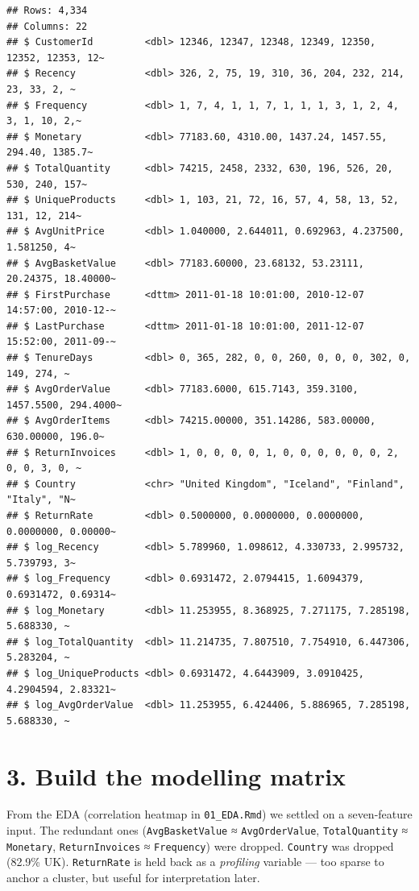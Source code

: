 \documentclass[
]{article}
\begin{document}
\begin{verbatim}
## Rows: 4,334
## Columns: 22
## $ CustomerId         <dbl> 12346, 12347, 12348, 12349, 12350, 12352, 12353, 12~
## $ Recency            <dbl> 326, 2, 75, 19, 310, 36, 204, 232, 214, 23, 33, 2, ~
## $ Frequency          <dbl> 1, 7, 4, 1, 1, 7, 1, 1, 1, 3, 1, 2, 4, 3, 1, 10, 2,~
## $ Monetary           <dbl> 77183.60, 4310.00, 1437.24, 1457.55, 294.40, 1385.7~
## $ TotalQuantity      <dbl> 74215, 2458, 2332, 630, 196, 526, 20, 530, 240, 157~
## $ UniqueProducts     <dbl> 1, 103, 21, 72, 16, 57, 4, 58, 13, 52, 131, 12, 214~
## $ AvgUnitPrice       <dbl> 1.040000, 2.644011, 0.692963, 4.237500, 1.581250, 4~
## $ AvgBasketValue     <dbl> 77183.60000, 23.68132, 53.23111, 20.24375, 18.40000~
## $ FirstPurchase      <dttm> 2011-01-18 10:01:00, 2010-12-07 14:57:00, 2010-12-~
## $ LastPurchase       <dttm> 2011-01-18 10:01:00, 2011-12-07 15:52:00, 2011-09-~
## $ TenureDays         <dbl> 0, 365, 282, 0, 0, 260, 0, 0, 0, 302, 0, 149, 274, ~
## $ AvgOrderValue      <dbl> 77183.6000, 615.7143, 359.3100, 1457.5500, 294.4000~
## $ AvgOrderItems      <dbl> 74215.00000, 351.14286, 583.00000, 630.00000, 196.0~
## $ ReturnInvoices     <dbl> 1, 0, 0, 0, 0, 1, 0, 0, 0, 0, 0, 0, 2, 0, 0, 3, 0, ~
## $ Country            <chr> "United Kingdom", "Iceland", "Finland", "Italy", "N~
## $ ReturnRate         <dbl> 0.5000000, 0.0000000, 0.0000000, 0.0000000, 0.00000~
## $ log_Recency        <dbl> 5.789960, 1.098612, 4.330733, 2.995732, 5.739793, 3~
## $ log_Frequency      <dbl> 0.6931472, 2.0794415, 1.6094379, 0.6931472, 0.69314~
## $ log_Monetary       <dbl> 11.253955, 8.368925, 7.271175, 7.285198, 5.688330, ~
## $ log_TotalQuantity  <dbl> 11.214735, 7.807510, 7.754910, 6.447306, 5.283204, ~
## $ log_UniqueProducts <dbl> 0.6931472, 4.6443909, 3.0910425, 4.2904594, 2.83321~
## $ log_AvgOrderValue  <dbl> 11.253955, 6.424406, 5.886965, 7.285198, 5.688330, ~
\end{verbatim}

\section{3. Build the modelling
matrix}\label{build-the-modelling-matrix}

From the EDA (correlation heatmap in \texttt{01\_EDA.Rmd}) we settled on
a seven-feature input. The redundant ones (\texttt{AvgBasketValue} ≈
\texttt{AvgOrderValue}, \texttt{TotalQuantity} ≈ \texttt{Monetary},
\texttt{ReturnInvoices} ≈ \texttt{Frequency}) were dropped.
\texttt{Country} was dropped (82.9\% UK). \texttt{ReturnRate} is held
back as a \emph{profiling} variable --- too sparse to anchor a cluster,
but useful for interpretation later.
\end{document}
